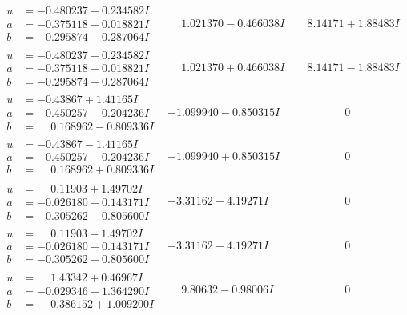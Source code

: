 \documentclass[1p]{elsarticle_modified}
\theoremstyle{definition}
\begin{document}
$$\begin{array}{c|c|c}
\begin{aligned}
u &= -0.480237 + 0.234582 I \\
a &= -0.375118 - 0.018821 I \\
b &= -0.295874 + 0.287064 I\end{aligned}
 & \phantom{-}1.021370 - 0.466038 I & \phantom{-}8.14171 + 1.88483 I \\ \hline\begin{aligned}
u &= -0.480237 - 0.234582 I \\
a &= -0.375118 + 0.018821 I \\
b &= -0.295874 - 0.287064 I\end{aligned}
 & \phantom{-}1.021370 + 0.466038 I & \phantom{-}8.14171 - 1.88483 I \\ \hline\begin{aligned}
u &= -0.43867 + 1.41165 I \\
a &= -0.450257 + 0.204236 I \\
b &= \phantom{-}0.168962 - 0.809336 I\end{aligned}
 & -1.099940 - 0.850315 I & \phantom{-0.000000 } 0 \\ \hline\begin{aligned}
u &= -0.43867 - 1.41165 I \\
a &= -0.450257 - 0.204236 I \\
b &= \phantom{-}0.168962 + 0.809336 I\end{aligned}
 & -1.099940 + 0.850315 I & \phantom{-0.000000 } 0 \\ \hline\begin{aligned}
u &= \phantom{-}0.11903 + 1.49702 I \\
a &= -0.026180 + 0.143171 I \\
b &= -0.305262 - 0.805600 I\end{aligned}
 & -3.31162 - 4.19271 I & \phantom{-0.000000 } 0 \\ \hline\begin{aligned}
u &= \phantom{-}0.11903 - 1.49702 I \\
a &= -0.026180 - 0.143171 I \\
b &= -0.305262 + 0.805600 I\end{aligned}
 & -3.31162 + 4.19271 I & \phantom{-0.000000 } 0 \\ \hline\begin{aligned}
u &= \phantom{-}1.43342 + 0.46967 I \\
a &= -0.029346 - 1.364290 I \\
b &= \phantom{-}0.386152 + 1.009200 I\end{aligned}
 & \phantom{-}9.80632 - 0.98006 I & \phantom{-0.000000 } 0 \\ \hline\begin{aligned}

\end{aligned}
\end{array}$$
\end{document}
